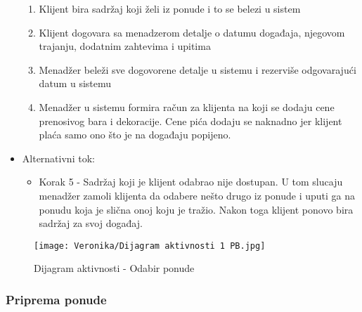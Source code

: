 \documentclass[a4paper]{article}
\begin{document}
\begin{itemize}
\begin{enumerate}
		    \item Klijent bira sadržaj koji želi iz ponude i to se belezi u sistem
		    \item Klijent dogovara sa menadzerom detalje o datumu događaja, njegovom trajanju, dodatnim zahtevima i upitima
		    \item Menadžer beleži sve dogovorene detalje u sistemu i rezerviše odgovarajući datum u sistemu
		    \item Menadžer u sistemu formira račun za klijenta na koji se dodaju cene prenosivog bara i dekoracije. Cene pića dodaju se naknadno jer klijent plaća samo ono što je na događaju popijeno.
        \end{enumerate}
    \item Alternativni tok:
        \begin{itemize}
            \item Korak 5 - Sadržaj koji je klijent odabrao nije dostupan. U tom slucaju menadžer zamoli klijenta da odabere nešto drugo iz ponude i uputi ga na ponudu koja je slična onoj koju je tražio. Nakon toga klijent ponovo bira sadržaj za svoj događaj.
        \end{itemize}
\end{itemize}


\begin{figure}[H]
    \centering
    \texttt{[image: Veronika/Dijagram aktivnosti 1 PB.jpg]}
    \caption{Dijagram aktivnosti - Odabir ponude}
    \label{fig:PrenosiviBar}
\end{figure}


\subsubsection{Priprema ponude}
\end{document}
